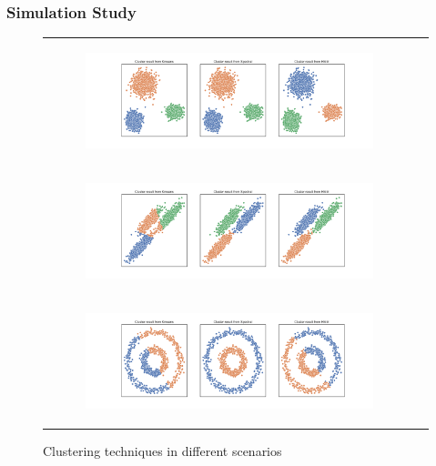 \documentclass{beamer}
\begin{document}
\begin{frame}
\frametitle{Simulation Study}

\begin{figure}[h!]%
    \centering
    {\renewcommand{\arraystretch}{0}
    \begin{tabular}{c@{}c}
    \begin{subfigure}[b]{.55\columnwidth}
        \centering
        \includegraphics[width=\columnwidth]{../Simu_results/sen1_clust.png}%
    \end{subfigure}\\
    \begin{subfigure}[t]{.55\columnwidth}   
        \centering 
        \includegraphics[width=\textwidth]{../Simu_results/sen2_clust.png}%
        \label{fig:mean and std of net34}
    \end{subfigure}\\
    \begin{subfigure}[t]{.55\columnwidth}   
        \centering 
        \includegraphics[width=\textwidth]{../Simu_results/sen3_clust.png}%
        \label{fig:mean and std of net34}
    \end{subfigure}
    \end{tabular}}
    \caption{{\small Clustering techniques in different scenarios}}
\end{figure}

\end{frame}
\end{document}
